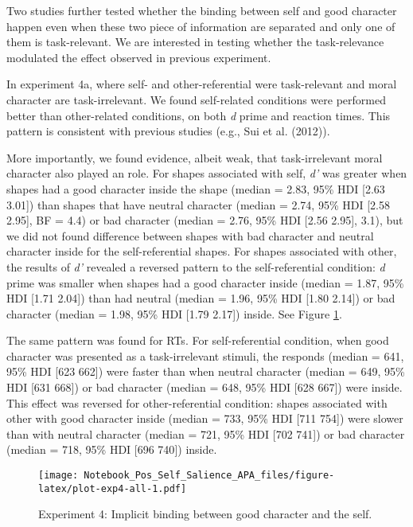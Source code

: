 \documentclass[
  man]{apa6}
\begin{document}
Two studies further tested whether the binding between self and good character happen even when these two piece of information are separated and only one of them is task-relevant. We are interested in testing whether the task-relevance modulated the effect observed in previous experiment.

In experiment 4a, where self- and other-referential were task-relevant and moral character are task-irrelevant. We found self-related conditions were performed better than other-related conditions, on both \emph{d} prime and reaction times. This pattern is consistent with previous studies (e.g., Sui et al. (2012)).

More importantly, we found evidence, albeit weak, that task-irrelevant moral character also played an role. For shapes associated with self, \emph{d'} was greater when shapes had a good character inside the shape (median = 2.83, 95\% HDI {[}2.63 3.01{]}) than shapes that have neutral character (median = 2.74, 95\% HDI {[}2.58 2.95{]}, BF = 4.4) or bad character (median = 2.76, 95\% HDI {[}2.56 2.95{]}, 3.1), but we did not found difference between shapes with bad character and neutral character inside for the self-referential shapes. For shapes associated with other, the results of \emph{d'} revealed a reversed pattern to the self-referential condition: \emph{d} prime was smaller when shapes had a good character inside (median = 1.87, 95\% HDI {[}1.71 2.04{]}) than had neutral (median = 1.96, 95\% HDI {[}1.80 2.14{]}) or bad character (median = 1.98, 95\% HDI {[}1.79 2.17{]}) inside. See Figure \ref{fig:plot-exp4-all}.

The same pattern was found for RTs. For self-referential condition, when good character was presented as a task-irrelevant stimuli, the responds (median = 641, 95\% HDI {[}623 662{]}) were faster than when neutral character (median = 649, 95\% HDI {[}631 668{]}) or bad character (median = 648, 95\% HDI {[}628 667{]}) were inside. This effect was reversed for other-referential condition: shapes associated with other with good character inside (median = 733, 95\% HDI {[}711 754{]}) were slower than with neutral character (median = 721, 95\% HDI {[}702 741{]}) or bad character (median = 718, 95\% HDI {[}696 740{]}) inside.

\begin{figure}
\centering
\texttt{[image: Notebook\_Pos\_Self\_Salience\_APA\_files/figure-latex/plot-exp4-all-1.pdf]}
\caption{\label{fig:plot-exp4-all}Experiment 4: Implicit binding between good character and the self.}
\end{figure}
\end{document}
